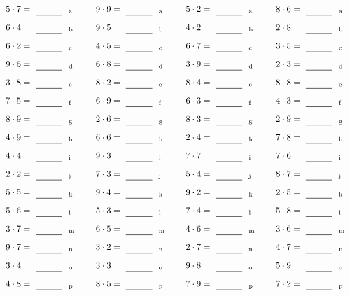 \documentclass
[
  draft    = true,
  fontsize = 11pt,
  parskip  = half-
]
{scrartcl}
\begin{document}
\par\vfill\par
\begin{align*}
    \pline{5\cdot7}&=\rline{a}
  & \pline{9\cdot9}&=\rline{a}
  & \pline{5\cdot2}&=\rline{a}
  & \pline{8\cdot6}&=\rline{a} \\[1ex]
    \pline{6\cdot4}&=\rline{b}
  & \pline{9\cdot5}&=\rline{b}
  & \pline{4\cdot2}&=\rline{b}
  & \pline{2\cdot8}&=\rline{b} \\[1ex]
    \pline{6\cdot2}&=\rline{c}
  & \pline{4\cdot5}&=\rline{c}
  & \pline{6\cdot7}&=\rline{c}
  & \pline{3\cdot5}&=\rline{c} \\[1ex]
    \pline{9\cdot6}&=\rline{d}
  & \pline{6\cdot8}&=\rline{d}
  & \pline{3\cdot9}&=\rline{d}
  & \pline{2\cdot3}&=\rline{d} \\[1ex]
    \pline{3\cdot8}&=\rline{e}
  & \pline{8\cdot2}&=\rline{e}
  & \pline{8\cdot4}&=\rline{e}
  & \pline{8\cdot8}&=\rline{e} \\[1ex]
    \pline{7\cdot5}&=\rline{f}
  & \pline{6\cdot9}&=\rline{f}
  & \pline{6\cdot3}&=\rline{f}
  & \pline{4\cdot3}&=\rline{f} \\[1ex]
    \pline{8\cdot9}&=\rline{g}
  & \pline{2\cdot6}&=\rline{g}
  & \pline{8\cdot3}&=\rline{g}
  & \pline{2\cdot9}&=\rline{g} \\[1ex]
    \pline{4\cdot9}&=\rline{h}
  & \pline{6\cdot6}&=\rline{h}
  & \pline{2\cdot4}&=\rline{h}
  & \pline{7\cdot8}&=\rline{h} \\[1ex]
    \pline{4\cdot4}&=\rline{i}
  & \pline{9\cdot3}&=\rline{i}
  & \pline{7\cdot7}&=\rline{i}
  & \pline{7\cdot6}&=\rline{i} \\[1ex]
    \pline{2\cdot2}&=\rline{j}
  & \pline{7\cdot3}&=\rline{j}
  & \pline{5\cdot4}&=\rline{j}
  & \pline{8\cdot7}&=\rline{j} \\[1ex]
    \pline{5\cdot5}&=\rline{k}
  & \pline{9\cdot4}&=\rline{k}
  & \pline{9\cdot2}&=\rline{k}
  & \pline{2\cdot5}&=\rline{k} \\[1ex]
    \pline{5\cdot6}&=\rline{l}
  & \pline{5\cdot3}&=\rline{l}
  & \pline{7\cdot4}&=\rline{l}
  & \pline{5\cdot8}&=\rline{l} \\[1ex]
    \pline{3\cdot7}&=\rline{m}
  & \pline{6\cdot5}&=\rline{m}
  & \pline{4\cdot6}&=\rline{m}
  & \pline{3\cdot6}&=\rline{m} \\[1ex]
    \pline{9\cdot7}&=\rline{n}
  & \pline{3\cdot2}&=\rline{n}
  & \pline{2\cdot7}&=\rline{n}
  & \pline{4\cdot7}&=\rline{n} \\[1ex]
    \pline{3\cdot4}&=\rline{o}
  & \pline{3\cdot3}&=\rline{o}
  & \pline{9\cdot8}&=\rline{o}
  & \pline{5\cdot9}&=\rline{o} \\[1ex]
    \pline{4\cdot8}&=\rline{p}
  & \pline{8\cdot5}&=\rline{p}
  & \pline{7\cdot9}&=\rline{p}
  & \pline{7\cdot2}&=\rline{p}
\end{align*}
\end{document}
